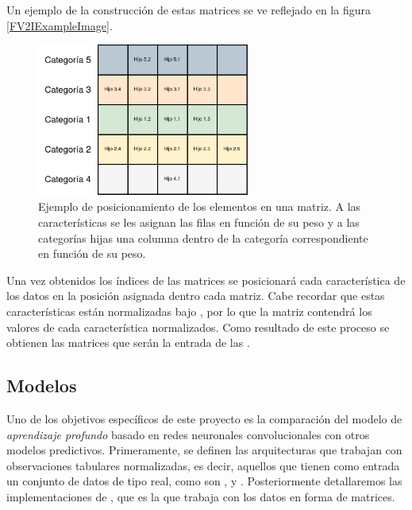         Un ejemplo de la construcción de estas matrices se ve reflejado en la figura \eqref{FV2IExampleImage}.

        \begin{figure}[H]
            \centering
            \includegraphics[width=7cm]{archivos/4.Metodologia/Matrices/FV2I}
            \caption{Ejemplo de posicionamiento de los elementos en una matriz. A las características se les asignan las filas en función de su peso y a las categorías hijas una columna dentro de la categoría correspondiente en función de su peso.}
            \label{FV2IExampleImage}
        \end{figure}

        Una vez obtenidos los índices de las matrices se posicionará cada característica de los datos en la posición asignada dentro cada matriz. Cabe recordar que estas características están normalizadas bajo , por lo que la matriz contendrá los valores de cada característica normalizados. Como resultado de este proceso se obtienen las matrices que serán la entrada de las .

    \subsection{Modelos}


        Uno de los objetivos específicos de este proyecto es la comparación del modelo de \textit{aprendizaje profundo} basado en redes neuronales convolucionales con otros modelos predictivos. Primeramente, se definen las arquitecturas que trabajan con observaciones tabulares normalizadas, es decir, aquellos que tienen como entrada un conjunto de datos de tipo real, como son ,  y . Posteriormente detallaremos las implementaciones de , que es la que trabaja con los datos en forma de matrices.

        \subsubsection{}

